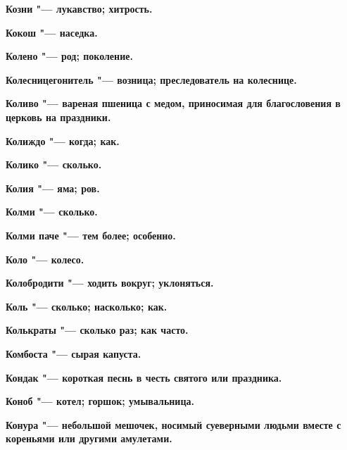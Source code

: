\bfseries Козни \normalfont{} "--- лукавство; хитрость. 




\bfseries Кокош \normalfont{} "--- наседка. 




\bfseries Колено \normalfont{} "--- род; поколение. 




\bfseries Колесницегонитель \normalfont{} "--- возница; преследователь на колеснице. 




\bfseries Коливо \normalfont{} "--- вареная пшеница с медом, приносимая для благословения в церковь на праздники. 




\bfseries Колиждо \normalfont{} "--- когда; как. 




\bfseries Колико \normalfont{} "--- сколько. 




\bfseries Колия \normalfont{} "--- яма; ров. 




\bfseries Колми \normalfont{} "--- сколько. 




\bfseries Колми паче \normalfont{} "--- тем более; особенно. 




\bfseries Коло \normalfont{} "--- колесо. 




\bfseries Колобродити \normalfont{} "--- ходить вокруг; уклоняться. 




\bfseries Коль \normalfont{} "--- сколько; насколько; как. 




\bfseries Колькраты \normalfont{} "--- сколько раз; как часто. 




\bfseries Комбоста \normalfont{} "--- сырая капуста. 




\bfseries Кондак \normalfont{} "--- короткая песнь в честь святого или праздника. 




\bfseries Коноб \normalfont{} "--- котел; горшок; умывальница. 




\bfseries Конура \normalfont{} "--- небольшой мешочек, носимый суеверными людьми вместе с кореньями или другими амулетами. 




